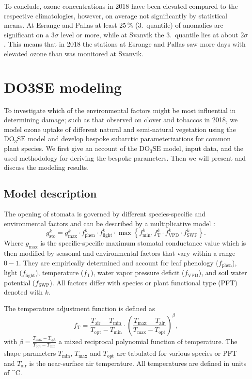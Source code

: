 \documentclass[bg, manuscript]{copernicus}
\begin{document}
To conclude, ozone concentrations in 2018 have been elevated compared to the respective climatologies, however, on average not significantly by statistical means. At Esrange and Pallas at least $25\,\unit{\%}$ (3.~quantile) of anomalies are significant on a $3\sigma$ level or more, while at Svanvik the 3.~quantile lies at about $2\sigma$. This means that in 2018 the stations at Esrange and Pallas saw more days with elevated ozone than was monitored at Svanvik.

\section{DO3SE modeling}
\label{sec:do3se}
To investigate which of the environmental factors might be most influential in determining  damage; such as that observed on clover and tobaccos in 2018, we model ozone uptake of different natural and semi-natural vegetation using the $\mathrm{DO_3SE}$ model and develop bespoke subarctic parameterizations for common plant species. We first give an account of the $\mathrm{DO_3SE}$ model, input data, and the used methodology for deriving the bespoke parameters. Then we will present and discuss the modeling results.

\subsection{Model description}
\label{subsec:model_describtion}
The opening of stomata is governed by different species-specific and environmental factors and can be described by a multiplicative model \citep{PTRS:Jarvis1976,Emberson2000,ICP:MappingManual2017}:
\begin{equation}
  g^k_\text{sto} = g^k_\text{max} \cdot f^k_\text{phen} \cdot f^k_\text{light} \cdot \max{\left\{f^k_\text{min}, f^k_\mathrm{T} \cdot f^k_\mathrm{VPD} \cdot f^k_\text{SWP}\right\}}.
  \label{eq:stomatal}
\end{equation}
%
Where $g_\mathrm{max}$ is the specific-specific maximum stomatal conductance value which is then modified by seasonal and environmental factors that vary within a range $0-1$. They are empirically determined and account for leaf phenology ($f_\text{phen}$), light ($f_\text{light}$), temperature ($f_\mathrm{T}$), water vapor pressure deficit ($f_\mathrm{VPD}$), and soil water potential ($f_\text{SWP}$). All factors differ with species or plant functional type (PFT) denoted with $k$.

The temperature adjustment function is defined as
%
\begin{equation}
  f_\mathrm{T} = \frac{T_\text{air}-T_\text{min}}{T_\text{opt}-T_\text{min}} \cdot \left(\frac{T_{\text{max}}-T_\text{air}}{T_{\text{max}}-T_\text{opt}}\right)^\beta,
  \label{eq:f_temp}
\end{equation}
with $\beta = \frac{T_\text{max}-T_\text{opt}}{T_\text{opt}-T_\text{min}}$ a mixed reciprocal polynomial function of temperature. The shape parameters $T_\text{min}$, $T_\text{max}$ and $T_\text{opt}$ are tabulated for various species or PFT and $T_\mathrm{air}$ is the near-surface air temperature. All temperatures are defined in units of \unit{^\circ C}.
\end{document}
